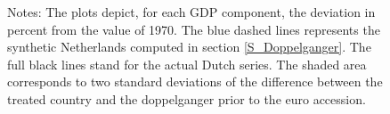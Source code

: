 \documentclass[12pt]{article}
\newcommand{\annote}[1]{\parbox{\textwidth}{\renewcommand{\baselinestretch}{1.0}\vspace{12pt} \small Notes: #1}}
\begin{document}
\begin{figure}[h!]
    \annote{The plots depict, for each GDP component, the deviation in percent from the value of 1970. The blue dashed lines represents the synthetic Netherlands computed in section \ref{S_Doppelganger}. The full black lines stand for the actual Dutch series. The shaded area corresponds to two standard deviations of the difference between the treated country and the doppelganger prior to the euro accession.}
\end{figure}
\end{document}
